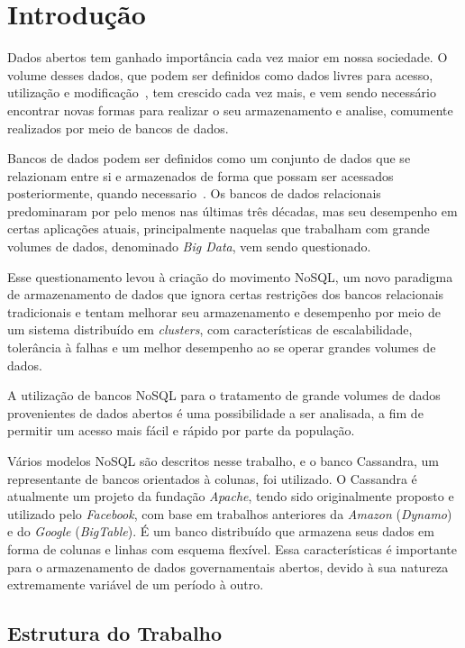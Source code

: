\chapter{Introdução}

Dados abertos tem ganhado importância cada vez maior em nossa sociedade. O volume desses dados, que podem ser definidos como dados livres para acesso, utilização e modificação~\cite{opendefinition}, tem crescido cada vez mais, e vem sendo necessário encontrar novas formas para realizar o seu armazenamento e analise, comumente realizados por meio de bancos de dados.

Bancos de dados podem ser definidos como um conjunto de dados que se relazionam entre si e armazenados de forma que possam ser acessados posteriormente, quando necessario~\cite{leavitt2010nosql}.
Os bancos de dados relacionais predominaram por pelo menos nas últimas três décadas, mas seu desempenho em certas aplicações atuais, principalmente naquelas que trabalham com grande volumes de dados, denominado \emph{Big Data}, vem sendo questionado. 

Esse questionamento levou à criação do movimento NoSQL, um novo paradigma de armazenamento de dados que ignora certas restrições dos bancos relacionais tradicionais e tentam melhorar seu armazenamento e desempenho por meio de um sistema distribuído em \emph{clusters}, com características de escalabilidade, tolerância à falhas e um melhor desempenho ao se operar grandes volumes de dados.

A utilização de bancos NoSQL para o tratamento de grande volumes de dados provenientes de dados abertos é uma possibilidade a ser analisada, a fim de permitir um acesso mais fácil e rápido por parte da população. 

Vários modelos NoSQL são descritos nesse trabalho, e o banco Cassandra, um representante de bancos orientados à colunas, foi utilizado. O Cassandra é atualmente um projeto da fundação \emph{Apache}, tendo sido  originalmente proposto e utilizado pelo \emph{Facebook}, com base em trabalhos anteriores da \emph{Amazon} (\emph{Dynamo}) e do \emph{Google} (\emph{BigTable}). É um banco distribuído que armazena seus dados em forma de colunas e linhas com esquema flexível. Essa características é importante para o armazenamento de dados governamentais abertos, devido à sua natureza extremamente variável de um período à outro.

\section{Estrutura do Trabalho}









